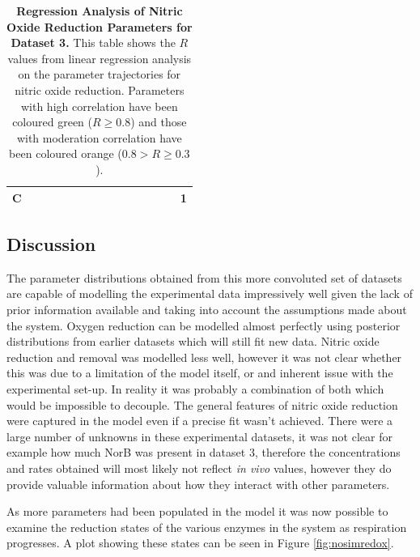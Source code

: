 \begin{table}[p]
{\begin{minipage}{24.4cm}
\begin{tabular}{|c|c|c|c|c|c|c|c|c|c|c|c|c|c|c|}
    \hline
    \cellcolor{dark-gray}C & \cellcolor{light-gray} & \cellcolor{light-gray} & \cellcolor{light-gray} & \cellcolor{light-gray} & \cellcolor{light-gray} & \cellcolor{light-gray} & \cellcolor{light-gray} & \cellcolor{light-gray} & \cellcolor{light-gray} & \cellcolor{light-gray} & \cellcolor{light-gray} & \cellcolor{light-gray} & \cellcolor{light-gray} & \cellcolor{light-gray}1\\
    \hline
  \end{tabular}
  \caption[Regression Analysis of Nitric Oxide Reduction Parameters]{{\bf Regression Analysis of Nitric Oxide Reduction Parameters for Dataset 3.} This table shows the $R$ values from linear regression analysis on the parameter trajectories for nitric oxide reduction. Parameters with high correlation have been coloured green ($R\geq0.8$) and those with moderation correlation have been coloured orange ($0.8>R\geq0.3$).
  \label{tab:noregress1}}
  \end{minipage}
  }
\end{table}
\afterpage{\clearpage}
\subsection{Discussion}
The parameter distributions obtained from this more convoluted set of datasets are capable of modelling the experimental data impressively well given the lack of prior information available and taking into account the assumptions made about the system. Oxygen reduction can be modelled almost perfectly using posterior distributions from earlier datasets which will still fit new data. Nitric oxide reduction and removal was modelled less well, however it was not clear whether this was due to a limitation of the model itself, or and inherent issue with the experimental set-up. In reality it was probably a combination of both which would be impossible to decouple. The general features of nitric oxide reduction were captured in the model even if a precise fit wasn't achieved. There were a large number of unknowns in these experimental datasets, it was not clear for example how much NorB was present in dataset 3, therefore the concentrations and rates obtained will most likely not reflect \textit{in vivo} values, however they do provide valuable information about how they interact with other parameters.

As more parameters had been populated in the model it was now possible to examine the reduction states of the various enzymes in the system as respiration progresses. A plot showing these states can be seen in Figure \ref{fig:nosimredox}.


